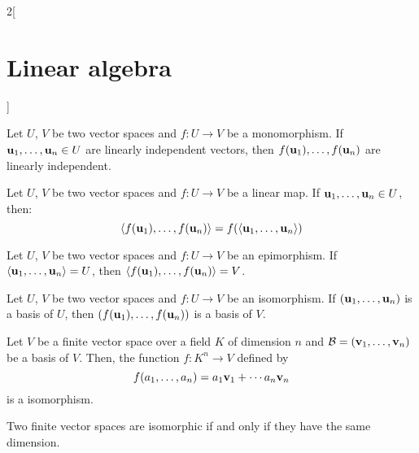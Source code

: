 \documentclass[../../../main.tex]{subfiles}
\begin{document}
\begin{multicols}{2}[\section{Linear algebra}]
  \begin{prop}
    Let $U$, $V$ be two vector spaces and $f:U\rightarrow V$ be a monomorphism. If $\boldsymbol{\mathrm{u}}_1,\ldots,\boldsymbol{\mathrm{u}}_n\in U$ are linearly independent vectors, then $f(\boldsymbol{\mathrm{u}}_1),\ldots,f(\boldsymbol{\mathrm{u}}_n)$  are linearly independent.
  \end{prop}
  \begin{lemma}
    Let $U$, $V$ be two vector spaces and $f:U\rightarrow V$ be a linear map. If $\boldsymbol{\mathrm{u}}_1,\ldots,\boldsymbol{\mathrm{u}}_n\in U$, then: $$\langle f(\boldsymbol{\mathrm{u}}_1),\ldots,f(\boldsymbol{\mathrm{u}}_n)\rangle=f(\langle\boldsymbol{\mathrm{u}}_1,\ldots,\boldsymbol{\mathrm{u}}_n\rangle)$$
  \end{lemma}
  \begin{corollary}
    Let $U$, $V$ be two vector spaces and $f:U\rightarrow V$ be an epimorphism. If $\langle\boldsymbol{\mathrm{u}}_1,\ldots,\boldsymbol{\mathrm{u}}_n\rangle= U$, then $\langle f(\boldsymbol{\mathrm{u}}_1),\ldots,f(\boldsymbol{\mathrm{u}}_n)\rangle=V$.
  \end{corollary}
  \begin{corollary}
    Let $U$, $V$ be two vector spaces and $f:U\rightarrow V$ be an isomorphism. If $(\boldsymbol{\mathrm{u}}_1,\ldots,\boldsymbol{\mathrm{u}}_n)$ is a basis of $U$, then $(f(\boldsymbol{\mathrm{u}}_1),\ldots,f(\boldsymbol{\mathrm{u}}_n))$ is a basis of $V$.
  \end{corollary}
  \begin{theorem}
    Let $V$ be a finite vector space over a field $K$ of dimension $n$ and $\mathcal{B}=(\boldsymbol{\mathrm{v}}_1,\ldots,\boldsymbol{\mathrm{v}}_n)$ be a basis of $V$. Then, the function $f:K^n\rightarrow V$ defined by $$f(a_1,\ldots,a_n)=a_1\boldsymbol{\mathrm{v}}_1+\cdots a_n\boldsymbol{\mathrm{v}}_n$$ is a isomorphism.
  \end{theorem}
  \begin{corollary}
    Two finite vector spaces are isomorphic if and only if they have the same dimension.
  \end{corollary}

\end{multicols}
\end{document}
